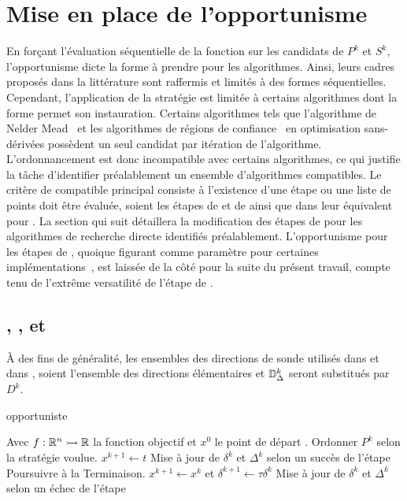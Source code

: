 \section{Mise en place de l'opportunisme}
En forçant l'évaluation séquentielle de la fonction sur les candidats de $P^k$ et $S^k$, l'opportunisme dicte la forme à prendre pour les algorithmes. Ainsi, leurs cadres proposés dans la littérature sont raffermis et limités à des formes séquentielles. Cependant, l'application de la stratégie est limitée à certains algorithmes dont la forme permet son instauration. Certains algorithmes tels que l'algorithme de Nelder Mead~\cite{NeMe65a} et les algorithmes de régions de confiance~\cite{CoScVibook} en optimisation sans-dérivées possèdent un seul candidat par itération de l'algorithme. L'ordonnancement est donc incompatible avec certains algorithmes, ce qui justifie la tâche d'identifier préalablement un ensemble d'algorithmes compatibles. Le critère de compatible principal consiste à l'existence d'une étape ou une liste de points doit être évaluée, soient les étapes de \SEARCH et de \POLL ainsi que dans leur équivalent pour \imfil. La section qui suit détaillera la modification des étapes de \POLL pour les algorithmes de recherche directe identifiés préalablement. L'opportunisme pour les étapes de \SEARCH, quoique figurant comme paramètre pour certaines implémentations~\cite{Le09a}, est laissée de la côté pour la suite du présent travail, compte tenu de l'extrême versatilité de l'étape de \SEARCH.
\subsection{\CS, \GPS, \GSS et \MADS}
À des fins de généralité, les ensembles des directions de sonde utilisés dans \CS et dans \MADS, soient l'ensemble des directions élémentaires et $\mathbb{D}^k_\Delta$ seront substitués par $D^k$. 
\begin{algorithm}[H]
	\caption{\textsf{\POLL opportuniste}}
	\label{alg1}
	\begin{algorithmic}
		\STATE Avec $f:\mathbb{R}^n \rightarrowtail \mathbb{R}$ la fonction objectif et $x^0$ le point de départ
		. \POLL
		\bindent
		\STATE Ordonner $P^k$ selon la stratégie voulue.
		\STATE $x^{k+1} \leftarrow t$
		\STATE Mise à jour de $\delta^k$ et $\Delta^k$ selon un succès de l'étape
		\STATE Poursuivre à la Terminaison.
		\ENDIF
		\STATE $x^{k+1} \leftarrow x^{k}$ et $\delta^{k+1} \leftarrow \tau\delta^k$
		\STATE Mise à jour de $\delta^k$ et $\Delta^k$ selon un échec de l'étape
		\ENDFOR
		\eindent
	\end{algorithmic}
\end{algorithm}
